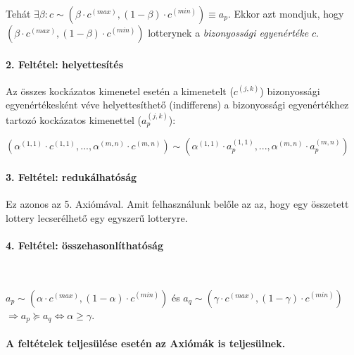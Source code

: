 \documentclass[a4paper,12pt]{article}
\begin{document}
Tehát $\exists \beta: c \sim (\beta\cdot c^{(max)}, (1-\beta)\cdot c^{(min)}) \equiv a_p$. Ekkor azt mondjuk, hogy $(\beta\cdot c^{(max)}, (1-\beta)\cdot c^{(min)})$ lotterynek a \emph{bizonyossági egyenértéke} $c$.

\paragraph{2. Feltétel: helyettesítés}

Az összes kockázatos kimenetel esetén a kimenetelt ($c^{(j,k)}$) bizonyossági egyenértékesként véve helyettesíthető (indifferens) a bizonyossági egyenértékhez tartozó kockázatos kimenettel ($a^{(j,k)}_p$):

$(\alpha^{(1,1)}\cdot c^{(1,1)},...,\alpha^{(m,n)}\cdot c^{(m,n)}) \sim (\alpha^{(1,1)}\cdot a^{(1,1)}_p,...,\alpha^{(m,n)}\cdot a^{(m,n)}_p) $


\paragraph{3. Feltétel: redukálhatóság}

Ez azonos az 5. Axiómával. Amit felhasználunk belőle az az, hogy egy összetett lottery lecserélhető egy egyszerű lotteryre.

\paragraph{4. Feltétel: összehasonlíthatóság}

\

$a_p \sim (\alpha \cdot c^{(max)}, (1-\alpha) \cdot c^{(min)})$ és 
$a_q \sim (\gamma \cdot c^{(max)}, (1-\gamma) \cdot c^{(min)})$ $\Rightarrow a_p \succeq a_q \Leftrightarrow \alpha \geq \gamma$. 

\paragraph{A feltételek teljesülése esetén az Axiómák is teljesülnek.}
\end{document}
